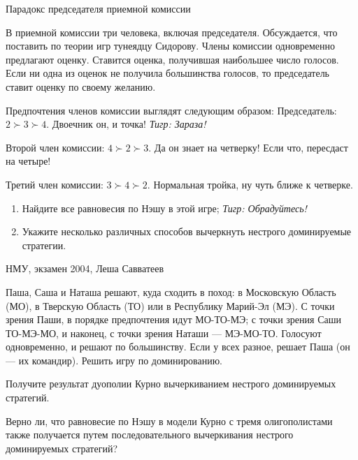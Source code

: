 \begin{problem}
 Парадокс председателя приемной комиссии \par %
В приемной комиссии три человека, включая председателя. Обсуждается, что поставить по теории игр тунеядцу Сидорову. Члены комиссии одновременно предлагают оценку. Ставится оценка, получившая наибольшее число голосов. Если ни одна из оценок не получила большинства голосов, то председатель ставит оценку по своему желанию.\par
Предпочтения членов комиссии выглядят следующим образом:
Председатель:  $2\succ 3\succ 4$. Двоечник он, и точка! {\it Тигр: Зараза!}\par
Второй член комиссии:  $4\succ 2\succ 3$. Да он знает на четверку! Если что, пересдаст на четыре!\par
Третий член комиссии:  $3\succ 4\succ 2$. Нормальная тройка, ну чуть ближе к четверке.\par
\begin{enumerate}
\item	Найдите все равновесия по Нэшу в этой игре; {\it Тигр: Обрадуйтесь!}\par
\item	Укажите несколько различных способов вычеркнуть нестрого доминируемые стратегии.
\end{enumerate}
\begin{sol}

\end{sol}
\end{problem}

\begin{problem}
\begin{source}
НМУ, экзамен 2004, Леша Савватеев
\end{source}
Паша, Саша и Наташа решают, куда сходить в поход: в Московскую Область (МО), в Тверскую Область (ТО) или в Республику Марий-Эл (МЭ). С точки зрения Паши, в порядке предпочтения идут МО-ТО-МЭ; с точки зрения Саши ТО-МЭ-МО, и наконец, с точки зрения Наташи --- МЭ-МО-ТО. Голосуют одновременно, и решают по большинству. Если у всех разное, решает Паша (он --- их командир). Решить игру по доминированию.






\begin{sol}

\end{sol}
\end{problem}

\begin{problem}
Получите результат дуополии Курно вычеркиванием нестрого доминируемых стратегий.\par
Верно ли, что равновесие по Нэшу в модели Курно с тремя олигополистами также получается путем последовательного вычеркивания нестрого доминируемых стратегий?

\begin{sol}

\end{sol}
\end{problem}



